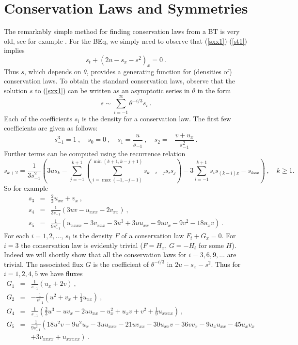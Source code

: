 \documentclass[12pt]{article}
\begin{document}
\section{Conservation Laws and Symmetries}    %

The remarkably simple method for finding conservation laws from a BT is very old,  see for example \cite{beq44}.
For the BEq, we simply need to observe that (\ref{sxx1})-(\ref{st1}) implies 
$$   s_t + (2 u - s_x - s^2)_x  = 0 \ . $$
Thus $s$, which depends on $\theta$,  provides a generating function for (densities of) conservation laws.
To obtain the standard conservation laws, 
observe that the solution $s$ to (\ref{sxx1}) can be written as an asymptotic series in $\theta$
in the form 
$$
s \sim  \sum_{i=-1}^{\infty}\theta^{-i/3}s_i \ . 
$$
Each of the coefficients $s_i$ is the density for a conservation law. 
The first few coefficients are given as follows: 
$$
s_{-1}^3 = 1 \ , \quad
s_{0}=0\ ,\quad
s_1=\frac{u}{s_{-1}}\ , \quad 
s_2=-\frac{v+u_x}{s_{-1}^2} \ .
$$
Further terms can be computed using the recurrence relation
$$
s_{k+2} =\frac{1}{3s_{-1}^2}
   \left(
   3us_{k}
  - \sum _{j=-1}^{k+1} \left( \sum_{i=\max(-1,-j-1)}^{\min(k+1,k-j+1)}s_{k-i-j}s_{i}s_{j} \right)
  -3\sum _{i=-1}^{k+1}s_{i}s_{(k-i)x}
  -s_{kxx} 
  \right)\ ,\quad k\geq1.
$$
So for example 
\begin{eqnarray*}
s_3&=&\frac{2}{3}u_{xx}+v_x\ , \\
s_4&=&\frac{1}{3s_{-1}}(3uv-u_{xxx}-2v_{xx})\ , \\
s_5&=&\frac{1}{9s_{-1}^2}(u_{xxxx}+3v_{xxx}-3u^3+3uu_{xx}-9uv_x-9v^2-18u_xv) \ . 
\end{eqnarray*}
For each $i=1,2,\ldots$, $s_i$ is the density $F$ of a conservation law $F_t + G_x = 0$. 
For $i=3$ the conservation law is evidently trivial ($F=H_x$, $G=-H_t$ for some $H$). Indeed we will
shortly show that all the conservation laws for $i=3,6,9,\ldots$ are trivial. The associated
flux $G$ is the  coefficient of $\theta^{-i/3}$ in $2u-s_x-s^2$.  Thus for $i=1,2,4,5$ we have fluxes 
\begin{eqnarray*}
  G_1&=&\frac{1}{s_{-1}}(u_x+2v) \ ,  \\ 
  G_2&=&-\frac{1}{s_{-1}^2}\left(u^2+v_x+\frac{1}{3}u_{xx}\right)\ , \\  
  G_4&=&\frac{1}{s_{-1}}\left(\frac{2}{3}u^3-uv_x-2uu_{xx}-u_x^2+u_xv+v^2+\frac{1}{9}u_{xxxx}\right)\ ,\\  
  G_5&=&\frac{1}{9s_{-1}^2}\left(18u^2v-9u^2u_x-3uu_{xxx}-21uv_{xx} -30u_{xx}v -36vv_x-9u_xu_{xx}-45u_xv_x\right.\\
     && \left. +3v_{xxxx}+u_{xxxxx}\right) \ . 
\end{eqnarray*}
\end{document}
